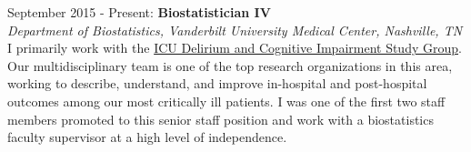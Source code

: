 \documentclass[5pt]{article}
\begin{document}
\noindent September 2015 - Present: \textbf{Biostatistician IV}\\
\indent \emph{Department of Biostatistics, Vanderbilt University Medical Center, Nashville, TN}\\
\indent I primarily work with the \href{http://www.icudelirium.org}{ICU Delirium and Cognitive Impairment Study Group}. Our multidisciplinary team is one of the top research organizations in this area, working to describe, understand, and improve in-hospital and post-hospital outcomes among our most critically ill patients. I was one of the first two staff members promoted to this senior staff position and work with a biostatistics faculty supervisor at a high level of independence.
\\
\end{document}
